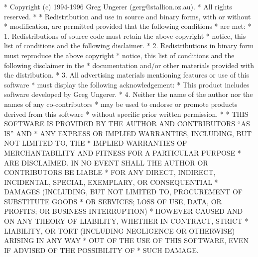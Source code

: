 \begin{copyrightEnv}
 * Copyright (c) 1994-1996 Greg Ungerer (gerg@stallion.oz.au).
 * All rights reserved.
 *
 * Redistribution and use in source and binary forms, with or without
 * modification, are permitted provided that the following conditions
 * are met:
 * 1. Redistributions of source code must retain the above copyright
 *    notice, this list of conditions and the following disclaimer.
 * 2. Redistributions in binary form must reproduce the above copyright
 *    notice, this list of conditions and the following disclaimer in the
 *    documentation and/or other materials provided with the distribution.
 * 3. All advertising materials mentioning features or use of this software
 *    must display the following acknowledgement:
 *      This product includes software developed by Greg Ungerer.
 * 4. Neither the name of the author nor the names of any co-contributors
 *    may be used to endorse or promote products derived from this software
 *    without specific prior written permission.
 *
 * THIS SOFTWARE IS PROVIDED BY THE AUTHOR AND CONTRIBUTORS ``AS IS'' AND
 * ANY EXPRESS OR IMPLIED WARRANTIES, INCLUDING, BUT NOT LIMITED TO, THE
 * IMPLIED WARRANTIES OF MERCHANTABILITY AND FITNESS FOR A PARTICULAR PURPOSE
 * ARE DISCLAIMED.  IN NO EVENT SHALL THE AUTHOR OR CONTRIBUTORS BE LIABLE
 * FOR ANY DIRECT, INDIRECT, INCIDENTAL, SPECIAL, EXEMPLARY, OR CONSEQUENTIAL
 * DAMAGES (INCLUDING, BUT NOT LIMITED TO, PROCUREMENT OF SUBSTITUTE GOODS
 * OR SERVICES; LOSS OF USE, DATA, OR PROFITS; OR BUSINESS INTERRUPTION)
 * HOWEVER CAUSED AND ON ANY THEORY OF LIABILITY, WHETHER IN CONTRACT, STRICT
 * LIABILITY, OR TORT (INCLUDING NEGLIGENCE OR OTHERWISE) ARISING IN ANY WAY
 * OUT OF THE USE OF THIS SOFTWARE, EVEN IF ADVISED OF THE POSSIBILITY OF
 * SUCH DAMAGE.
\end{copyrightEnv}

